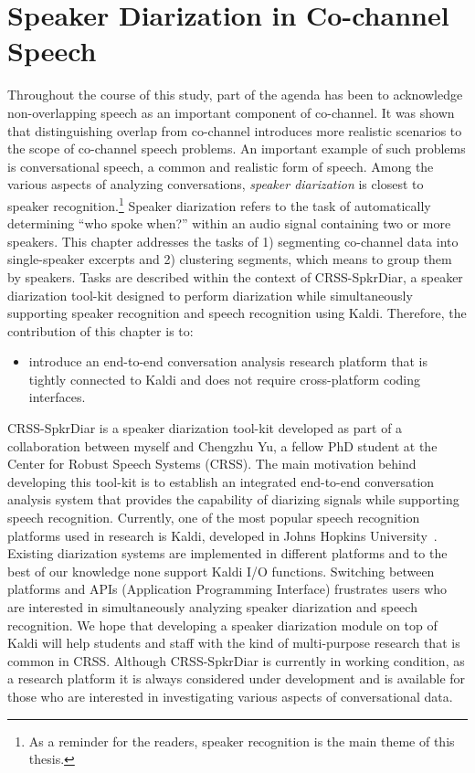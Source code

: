 
\chapter{Speaker Diarization in Co-channel Speech}
\label{chap:spkr_diar}

Throughout the course of this study, part of the agenda has been to acknowledge non-overlapping speech as an important component of co-channel. 
It was shown that distinguishing overlap from co-channel introduces more realistic scenarios to the scope of co-channel speech problems. 
An important example of such problems is conversational speech, a common and realistic form of speech. 
Among the various aspects of analyzing conversations, {\it speaker diarization} is closest to speaker recognition.\footnote{As a reminder for the readers, speaker recognition is the main theme of this thesis.} 
Speaker diarization refers to the task of automatically determining ``who spoke when?'' within an audio signal containing two or more speakers. 
This chapter addresses the tasks of 1) segmenting co-channel data into single-speaker excerpts and 2) clustering segments, which means to group them by speakers. 
Tasks are described within the context of CRSS-SpkrDiar, a speaker diarization tool-kit designed to perform diarization while simultaneously supporting speaker recognition and speech recognition using Kaldi\cite{kaldi}. 
Therefore, the contribution of this chapter is to: 
\begin{itemize}
	\item introduce an end-to-end conversation analysis research platform that is tightly connected to Kaldi and does not require cross-platform coding interfaces. 
\end{itemize}

CRSS-SpkrDiar is a speaker diarization tool-kit developed as part of a collaboration between myself and Chengzhu Yu, a fellow PhD student at the Center for Robust Speech Systems (CRSS). 
The main motivation behind developing this tool-kit is to establish an integrated end-to-end conversation analysis system that provides the capability of diarizing  signals while supporting speech recognition. 
Currently, one of the most popular speech recognition platforms used in research is Kaldi, developed in Johns Hopkins University~\cite{kaldi}. 
Existing diarization systems are implemented in different platforms and to the best of our knowledge none support Kaldi I/O functions. 
Switching between platforms and APIs (Application Programming Interface)  frustrates users who are interested in simultaneously analyzing speaker diarization and speech recognition. 
We hope that developing a speaker diarization module on top of Kaldi will help students and staff with the kind of multi-purpose research that is common in CRSS. 
Although CRSS-SpkrDiar is currently in working condition, as a research platform it is always considered under development and is available for those who are interested in investigating various aspects of conversational data. 

